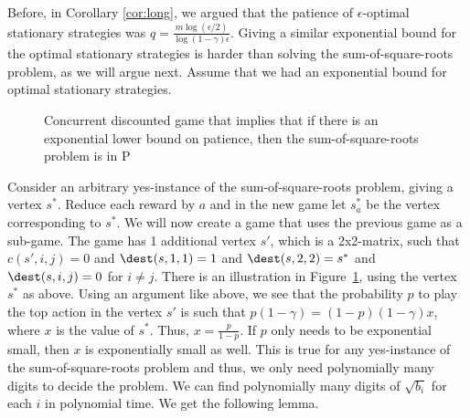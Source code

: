 Before, in Corollary \ref{cor:long}, we argued that the patience of $\epsilon$-optimal stationary strategies was $q=\frac{m\log(\epsilon/2)}{\log(1-\gamma)\epsilon}$.
Giving a similar exponential bound for the optimal stationary strategies is harder than solving the sum-of-square-roots problem, as we will argue next.
Assume that we had an exponential bound for optimal stationary strategies.

\begin{figure}

\center
{}
\caption{Concurrent discounted game that implies that if there is an exponential lower bound on patience, then the sum-of-square-roots problem is in P}\label{fig:exact-hard}
\end{figure}

Consider an arbitrary yes-instance of the sum-of-square-roots problem, giving a vertex $s^*$. Reduce each reward by $a$ and in the new game let $s^*_a$ be the vertex corresponding to $s^*$. 
We will now create a game that uses the previous game as a sub-game.
The game has 1 additional vertex $s'$, which is a 2x2-matrix, such that $c(s',i,j)=0$ and $\dest(s,1,1)=1$ and $\dest(s,2,2)=s^*$ and $\dest(s,i,j)=0$ for $i\neq j$.
There is an illustration in Figure~\ref{fig:exact-hard}, using the vertex $s^*$ as above. 
Using an argument like above, we see that the probability $p$ to play the top action in the vertex $s'$ is such that $p(1-\gamma)=(1-p)(1-\gamma)x$, where $x$ is the value of $s^*$. Thus, $x=\frac{p}{1-p}$. If $p$ only needs to be exponential small, then $x$ is exponentially small as well. This is true for any yes-instance of the sum-of-square-roots problem and thus, we only need polynomially many digits to decide the problem. We can find polynomially many digits of $\sqrt{b_i}$ for each $i$ in polynomial time. We get the following lemma.

